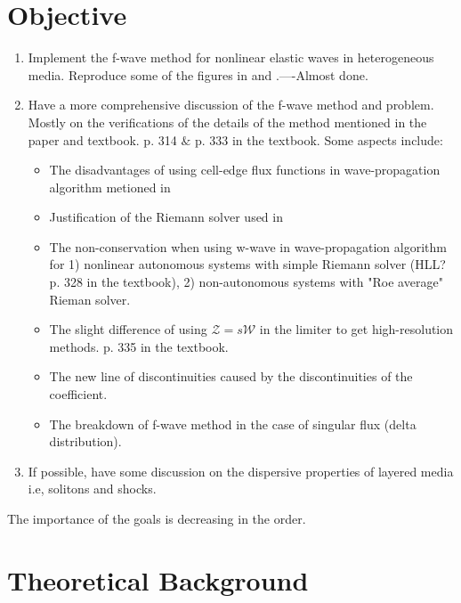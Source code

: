 \documentclass{article}
\begin{document}
\section{Objective}
\begin{enumerate}
\item Implement the f-wave method for nonlinear elastic waves in heterogeneous media. Reproduce some of the figures in \cite{bale2002} \cite{leveque2003} and \cite{ketcheson2012}.----Almost done.
\item Have a more comprehensive discussion of the f-wave method and problem. Mostly on the verifications of the details of the method mentioned in the paper and textbook. p. 314 $\&$ p. 333 in the textbook. Some aspects include:
    \begin{itemize}
    \item The disadvantages of using cell-edge flux functions in wave-propagation algorithm metioned in \cite[p. 957]{bale2002}
    \item Justification of the Riemann solver used in \cite[p. 967]{bale2002}
    \item The non-conservation when using w-wave in wave-propagation algorithm for 1) nonlinear autonomous systems with simple Riemann solver (HLL? p. 328 in the textbook), 2) non-autonomous systems with "Roe average" Rieman solver.
    \item The slight difference of using $\mathcal{Z}=s\mathcal{W}$ in the limiter to get high-resolution methods. \cite[p. 964]{bale2002} p. 335 in the textbook.
    \item The new line of discontinuities caused by the discontinuities of the coefficient. \cite[p. 960]{bale2002}
    \item The breakdown of f-wave method in the case of singular flux (delta distribution).  \cite[p. 961]{bale2002}
    \end{itemize}
\item If possible, have some discussion on the dispersive properties of layered media i.e, solitons and shocks.
\end{enumerate}
The importance of the goals is decreasing in the order.
\section{Theoretical Background}
\end{document}

